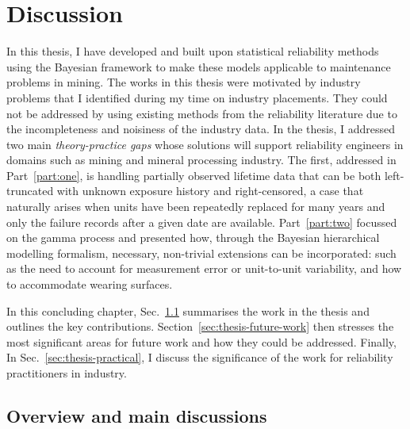 \chapter{Discussion}\label{chap:chapter7}

In this thesis, I have developed and built upon statistical reliability methods using the Bayesian framework to make these models applicable to maintenance problems in mining. The works in this thesis were motivated by industry problems that I identified during my time on industry placements. They could not be addressed by using existing methods from the reliability literature due to the incompleteness and noisiness of the industry data. In the thesis, I addressed two main \textit{theory-practice gaps} whose solutions will support reliability engineers in domains such as mining and mineral processing industry. The first, addressed in Part~\ref{part:one}, is handling partially observed lifetime data that can be both left-truncated with unknown exposure history and right-censored, a case that naturally arises when units have been repeatedly replaced for many years and only the failure records after a given date are available. Part~\ref{part:two} focussed on the gamma process and presented how, through the Bayesian hierarchical modelling formalism, necessary, non-trivial extensions can be incorporated: such as the need to account for measurement error or unit-to-unit variability, and how to accommodate wearing surfaces.

In this concluding chapter, Sec.~\ref{sec:thesis-summary} summarises the work in the thesis and outlines the key contributions. Section~\ref{sec:thesis-future-work} then stresses the most significant areas for future work and how they could be addressed. Finally, In Sec.~\ref{sec:thesis-practical}, I discuss the significance of the work for reliability practitioners in industry.

\section{Overview and main discussions} \label{sec:thesis-summary}

